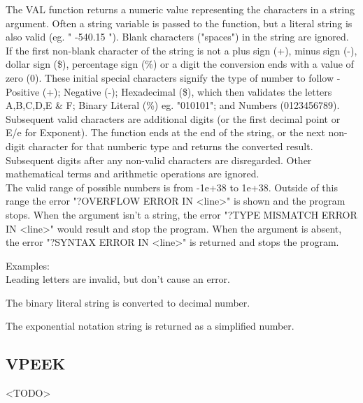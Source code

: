 The {\ttfamily VAL} function returns a numeric value representing the
characters in a string argument.  Often a string variable is passed to the
function, but a literal string is also valid (eg. "  -540.15 "). Blank
characters ("spaces") in the string are ignored.  If the first non-blank
character of the string is not a plus sign (+), minus sign (-), dollar sign
(\$), percentage sign (\%) or a digit the conversion ends with a value of zero
(0).  These initial special characters signify the type of number to follow -
Positive (+); Negative (-); Hexadecimal (\$), which then validates the letters
A,B,C,D,E \& F; Binary Literal (\%) eg. "010101"; and Numbers (0123456789).
Subsequent valid characters are additional digits (or the first decimal point
or E/e for Exponent).  The function ends at the end of the string, or the next
non-digit character for that numberic type and returns the converted result.
Subsequent digits after any non-valid characters are disregarded.  Other
mathematical terms and arithmetic operations are ignored.\\

The valid range of possible numbers is from -1e+38 to 1e+38. Outside of this
range the error "?OVERFLOW ERROR IN <line>" is shown and the program stops.
When the argument isn't a string, the error "?TYPE MISMATCH ERROR IN <line>"
would result and stop the program.  When the argument is absent, the error
"?SYNTAX ERROR IN <line>" is returned and stops the program.\\


Examples:\\

Leading letters are invalid, but don't cause an error.\newline
{}

The binary literal string is converted to decimal number.\newline
{}

The exponential notation string is returned as a simplified number.\newline
{}

\subsection{VPEEK}

<TODO>

